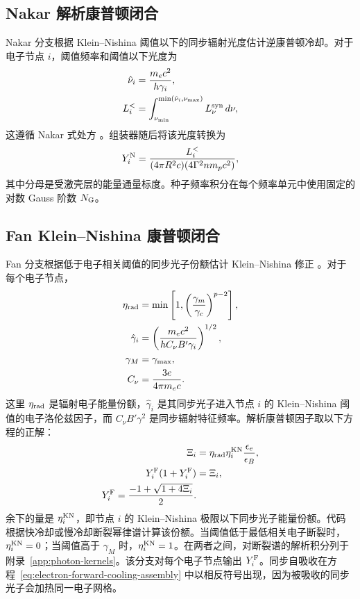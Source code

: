 \documentclass[twocolumn]{aastex702}
\begin{document}
\subsection{Nakar 解析康普顿闭合}

Nakar 分支根据 Klein--Nishina 阈值以下的同步辐射光度估计逆康普顿冷却。对于电子节点 \(i\)，阈值频率和阈值以下光度为
\begin{equation}
\begin{aligned}
\hat\nu_i&=\frac{m_e c^2}{h\gamma_i},\\
L_i^{<}&=
\int_{\nu_{\min}}^{\min(\hat\nu_i,\nu_{\max})}
L_\nu^{\rm syn}\,d\nu,
\end{aligned}
\end{equation}
这遵循 Nakar 式处方 \citep{NakarAndoSari2009}。组装器随后将该光度转换为
\begin{equation}
Y_i^{\rm N}=
\frac{L_i^{<}}
{(4\pi R^2 c)(4\Gamma^2 n m_p c^2)},
\end{equation}
其中分母是受激壳层的能量通量标度。种子频率积分在每个频率单元中使用固定的对数 Gauss 阶数 \(N_{\rm G}\)。

\subsection{Fan Klein--Nishina 康普顿闭合}

Fan 分支根据低于电子相关阈值的同步光子份额估计 Klein--Nishina 修正 \citep{FanPiran2008}。对于每个电子节点，
\begin{equation}
\begin{aligned}
\eta_{\rm rad}&=\min\left[1,\left(\frac{\gamma_m}{\gamma_c}\right)^{p-2}\right],\\
\hat\gamma_i&=
\left(\frac{m_e c^2}{hC_\nu B'\gamma_i}\right)^{1/2},\\
\gamma_M&=\gamma_{\max},\\
C_\nu&=\frac{3e}{4\pi m_e c}.
\end{aligned}
\label{eq:synch-frequency-coeff}
\end{equation}
这里 \(\eta_{\rm rad}\) 是辐射电子能量份额，\(\hat\gamma_i\) 是其同步光子进入节点 \(i\) 的 Klein--Nishina 阈值的电子洛伦兹因子，而 \(C_\nu B'\gamma^2\) 是同步辐射特征频率。解析康普顿因子取以下方程的正解：
\begin{equation}
\begin{aligned}
\Xi_i&=\eta_{\rm rad}\eta_i^{\rm KN}\frac{\epsilon_e}{\epsilon_B},\\
Y_i^{\rm F}(1+Y_i^{\rm F})&=\Xi_i,\\
Y_i^{\rm F}=
\frac{-1+\sqrt{1+4\Xi_i}}{2}.
\end{aligned}
\end{equation}
余下的量是 \(\eta_i^{\rm KN}\)，即节点 \(i\) 的 Klein--Nishina 极限以下同步光子能量份额。代码根据快冷却或慢冷却断裂幂律谱计算该份额。当阈值低于最低相关电子断裂时，\(\eta_i^{\rm KN}=0\)；当阈值高于 \(\gamma_M\) 时，\(\eta_i^{\rm KN}=1\)。在两者之间，对断裂谱的解析积分列于附录~\ref{app:photon-kernels}。该分支对每个电子节点输出 \(Y_i^{\rm F}\)。同步自吸收在方程~\eqref{eq:electron-forward-cooling-assembly} 中以相反符号出现，因为被吸收的同步光子会加热同一电子网格。
\end{document}
